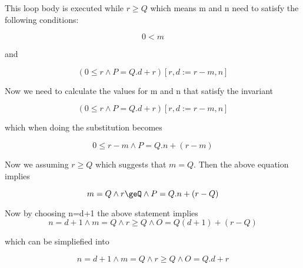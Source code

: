 \documentclass[10pt,a4paper]{article}
\begin{document}
This loop body is executed while $r\ge Q$ which means m and n need to satisfy the following conditions:

\begin{equation}
 0<m
\end{equation}

and

\begin{equation}
 (0\le r \wedge P = Q.d + r)[r,d:= r-m,n] 
\end{equation}

Now we  need to calculate the values for m and n that satisfy the invariant

\begin{equation}
  (0\le r \wedge P = Q.d + r)[r,d:= r-m,n] 
\end{equation}

which when doing the substitution becomes 

\begin{equation}
  0\le r -m \wedge P = Q.n + (r-m)
\end{equation}

Now we assuming $r\ge Q$ which suggests that $m=Q$. Then the above equation implies

\begin{equation}
 m=Q \wedge r\geQ \wedge P=Q.n+(r-Q)
\end{equation}

Now by choosing n=d+1 the above statement implies
\begin{equation}
 n=d+1\wedge m=Q\wedge r\ge Q \wedge O=Q(d+1)+(r-Q)
\end{equation}

which can be simpliefied into

\begin{equation}
 n=d+1\wedge m=Q\wedge r\ge Q \wedge O=Q.d+r
\end{equation}
\end{document}
